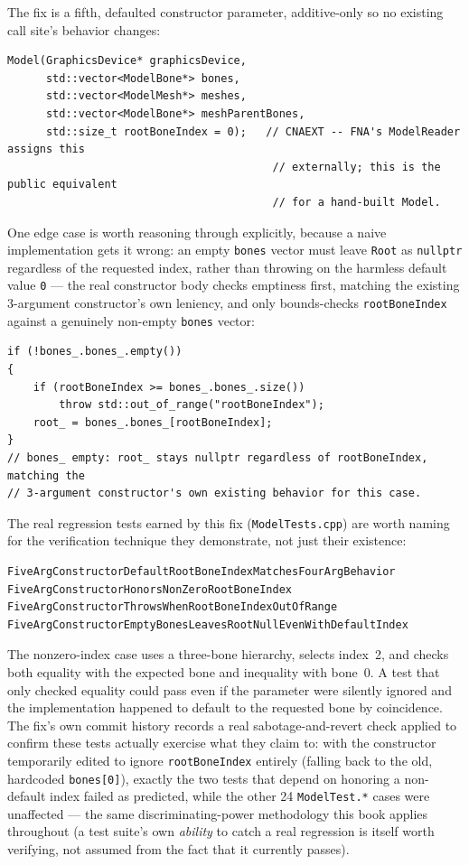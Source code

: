 The fix is a fifth, defaulted constructor parameter, additive-only so no existing call site's
behavior changes:

\begin{lstlisting}
Model(GraphicsDevice* graphicsDevice,
      std::vector<ModelBone*> bones,
      std::vector<ModelMesh*> meshes,
      std::vector<ModelBone*> meshParentBones,
      std::size_t rootBoneIndex = 0);   // CNAEXT -- FNA's ModelReader assigns this
                                         // externally; this is the public equivalent
                                         // for a hand-built Model.
\end{lstlisting}

One edge case is worth reasoning through explicitly, because a naive implementation gets it
wrong: an empty \texttt{bones} vector must leave \texttt{Root} as \texttt{nullptr} regardless of
the requested index, rather than throwing on the harmless default value \texttt{0} --- the real
constructor body checks emptiness first, matching the existing 3-argument constructor's own
leniency, and only bounds-checks \texttt{rootBoneIndex} against a genuinely non-empty
\texttt{bones} vector:

\begin{lstlisting}
if (!bones_.bones_.empty())
{
    if (rootBoneIndex >= bones_.bones_.size())
        throw std::out_of_range("rootBoneIndex");
    root_ = bones_.bones_[rootBoneIndex];
}
// bones_ empty: root_ stays nullptr regardless of rootBoneIndex, matching the
// 3-argument constructor's own existing behavior for this case.
\end{lstlisting}

The real regression tests earned by this fix (\texttt{ModelTests.cpp}) are worth naming for the
verification technique they demonstrate, not just their existence:

\begin{lstlisting}
FiveArgConstructorDefaultRootBoneIndexMatchesFourArgBehavior
FiveArgConstructorHonorsNonZeroRootBoneIndex
FiveArgConstructorThrowsWhenRootBoneIndexOutOfRange
FiveArgConstructorEmptyBonesLeavesRootNullEvenWithDefaultIndex
\end{lstlisting}

The nonzero-index case uses a three-bone hierarchy, selects index~2, and checks both equality
with the expected bone and inequality with bone~0. A test that only checked equality could pass
even if the parameter were silently ignored and the implementation happened to default to the
requested bone by coincidence. The fix's own commit history records a real sabotage-and-revert
check applied to confirm these tests actually exercise what they claim to: with the constructor
temporarily edited to ignore \texttt{rootBoneIndex} entirely (falling back to the old, hardcoded
\texttt{bones[0]}), exactly the two tests that depend on honoring a non-default index failed as
predicted, while the other 24 \texttt{ModelTest.*} cases were unaffected --- the same
discriminating-power methodology this book applies throughout (a test suite's own
\emph{ability} to catch a real regression is itself worth verifying, not assumed from the fact
that it currently passes).

